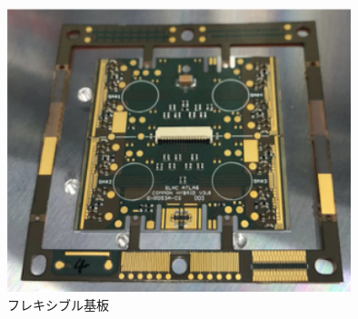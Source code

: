 \begin{figure}[bpt]\centering
\includegraphics[width=10cm]{./pcb.png}
\caption[フレキシブル基板]{フレキシブル基板}
\label{pcb}
\end{figure}


